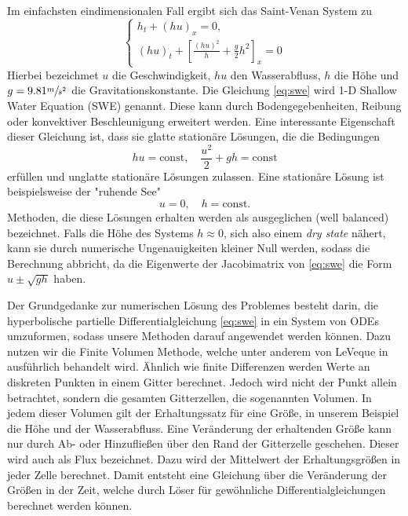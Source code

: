Im einfachsten eindimensionalen Fall ergibt sich das Saint-Venan System zu 
\begin{equation}
\begin{cases}
 h_t + (hu)_x = 0,\\
 (hu)_t + \left[\frac{(hu)^2}{h} + \frac{g}{2}h^2\right]_x = 0
\end{cases} 
\label{eq:swe}
\end{equation}
Hierbei bezeichmet $u$ die Geschwindigkeit, $hu$ den Wasserabfluss, $h$ die Höhe und $g=9.81 \sfrac{m}{s^2}$ die Gravitationskonstante.
Die Gleichung \eqref{eq:swe} wird 1-D Shallow Water Equation (SWE) genannt.
Diese kann durch Bodengegebenheiten, Reibung oder konvektiver Beschleunigung erweitert werden.
Eine interessante Eigenschaft dieser Gleichung ist, dass sie glatte stationäre Lösungen, die die Bedingungen
\[
 hu = \text{const}, \quad \frac{u^2}{2}+gh = \text{const}
\]
erfüllen und unglatte stationäre Lösungen zulassen. Eine stationäre Lösung ist beispielsweise der "ruhende See"
\[
 u=0, \quad h=\text{const}.
\]
Methoden, die diese Lösungen erhalten werden als ausgeglichen (well balanced) bezeichnet. Falls die Höhe des Systems $h \approx 0 $, sich also einem \textit{dry state} nähert, kann sie durch numerische Ungenauigkeiten kleiner Null werden, sodass die Berechnung abbricht, da die Eigenwerte der Jacobimatrix von \eqref{eq:swe} die Form $u\pm \sqrt{gh}$ haben.

Der Grundgedanke zur numerischen Lösung des Problemes besteht darin, die hyperbolische partielle Differentialgleichung \eqref{eq:swe} in ein System von ODEs umzuformen, sodass unsere Methoden darauf angewendet werden können.
Dazu nutzen wir die Finite Volumen Methode, welche unter anderem von LeVeque in \cite[Abschnitt 4.]{leveque2002finite} ausführlich behandelt wird. Ähnlich wie finite Differenzen werden Werte an diskreten Punkten in einem Gitter berechnet. Jedoch wird nicht der Punkt allein betrachtet, sondern die gesamten Gitterzellen, die sogenannten Volumen. In jedem dieser Volumen gilt der Erhaltungssatz für eine Größe, in unserem Beispiel die Höhe und der Wasserabfluss. Eine Veränderung der erhaltenden Größe kann nur durch Ab- oder Hinzufließen über den Rand der Gitterzelle geschehen. Dieser wird auch als Flux bezeichnet. Dazu wird der Mittelwert der Erhaltungsgrößen in jeder Zelle berechnet. Damit entsteht eine Gleichung über die Veränderung der Größen in der Zeit, welche durch Löser für gewöhnliche Differentialgleichungen berechnet werden können.

